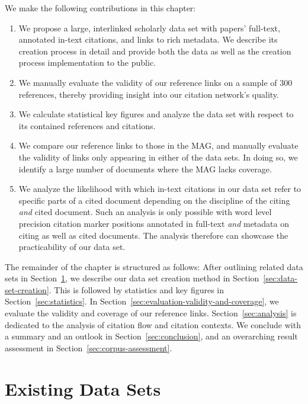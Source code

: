 We make the following contributions in this chapter:
\begin{enumerate}
    \item We propose a large, interlinked scholarly data set with papers' full-text, annotated in-text citations, and links to rich metadata. We describe its creation process in detail and provide both the data as well as the creation process implementation to the public. 
    \item We manually evaluate the validity of our reference links on a sample of 300 references, thereby providing insight into our citation network's quality.
    \item We calculate statistical key figures and analyze the data set with respect to its contained references and citations.
    \item We compare our reference links to those in the MAG, and manually evaluate the validity of links only appearing in either of the data sets. In doing so, we identify a large number of documents where the MAG lacks coverage.
    \item We analyze the likelihood with which in-text citations in our data set refer to specific parts of a cited document depending on the discipline of the citing \emph{and} cited document. Such an analysis is only possible with word level precision citation marker positions annotated in full-text \emph{and} metadata on citing as well as cited documents. The analysis therefore can showcase the practicability of our data set.
\end{enumerate}

The remainder of the chapter is structured as follows: After outlining related data sets in Section~\ref{sec:related-work}, we describe our data set creation method in Section~\ref{sec:data-set-creation}. This is followed by statistics and key figures in Section~\ref{sec:statistics}. In Section~\ref{sec:evaluation-validity-and-coverage}, we evaluate the validity and coverage of our reference links. Section~\ref{sec:analysis} is dedicated to the analysis of citation flow and citation contexts. We conclude with a summary and an outlook in Section~\ref{sec:conclusion}, and an overarching result assessment in Section~\ref{sec:corpus-assessment}.

\section{Existing Data Sets}
\label{sec:related-work}

